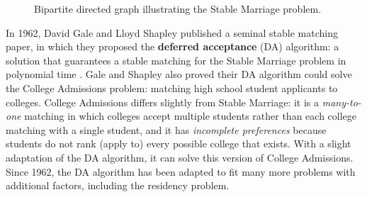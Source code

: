 \begin{figure} \centering
  \caption{Bipartite
    directed graph illustrating the Stable Marriage problem.}
  \label{fig:stable-marriage}
\end{figure}

In 1962, David Gale and Lloyd Shapley published a seminal stable matching paper, in
which they proposed the \textbf{deferred acceptance} (DA) algorithm: a solution
that guarantees a stable matching for the Stable Marriage problem in polynomial
time \cite{gale_shapley}. Gale and Shapley also proved their DA algorithm could
solve the College Admissions problem: matching high school student applicants to
colleges. College Admissions differs slightly from Stable Marriage: it is a
\textit{many-to-one} matching in which colleges accept multiple students rather
than each college matching with a single student, and it has \textit{incomplete
  preferences} because students do not rank (apply to) every possible college that
exists. With a slight adaptation of the DA algorithm, it can solve this
version of College Admissions. Since 1962, the DA algorithm has been adapted to
fit many more problems with additional factors, including the residency problem.

